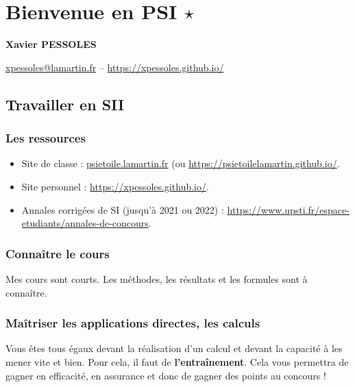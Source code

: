 \renewcommand{\repExo}{\repRel/PSI_Cy_01_ModelisationSystemes/Ch_02_RevisionsSLCI/}
\renewcommand{\nomExo}{01_Modelisation_Perf_Fiche}
\graphicspath{{\repStyle/png}{\repExo\nomExo/images}}
%


\setchapterpreamble[u]{\margintoc}

\chapter*{Bienvenue en PSI $\star$}
\setcounter{chapter}{1}

\begin{center}
\Large
\textsf{\textbf{Xavier PESSOLES}}
\normalsize 

\vspace{.5cm} 

\url{xpessoles@lamartin.fr} -- \url{https://xpessoles.github.io/}
\normalsize
\end{center}
\section{Travailler en SII}
\subsection{Les ressources}
\begin{itemize}
\item Site de classe : \url{psietoile.lamartin.fr} (ou \url{https://psietoilelamartin.github.io/}.
\item Site personnel : \url{https://xpessoles.github.io/}.
\item Annales corrigées de SI (jusqu'à 2021 ou 2022) : \url{https://www.upsti.fr/espace-etudiants/annales-de-concours}. 

\end{itemize}
\subsection{Connaître le cours}
Mes cours sont courts. Les méthodes, les résultats et les formules sont à connaître. 

\subsection{Maîtriser les applications directes, les calculs}
Vous êtes tous égaux devant la réalisation d'un calcul et devant la capacité à les mener vite et bien. 
Pour cela, il faut de \textbf{l’entraînement}. Cela vous permettra de gagner en efficacité, en assurance et donc de gagner des points au concours !

